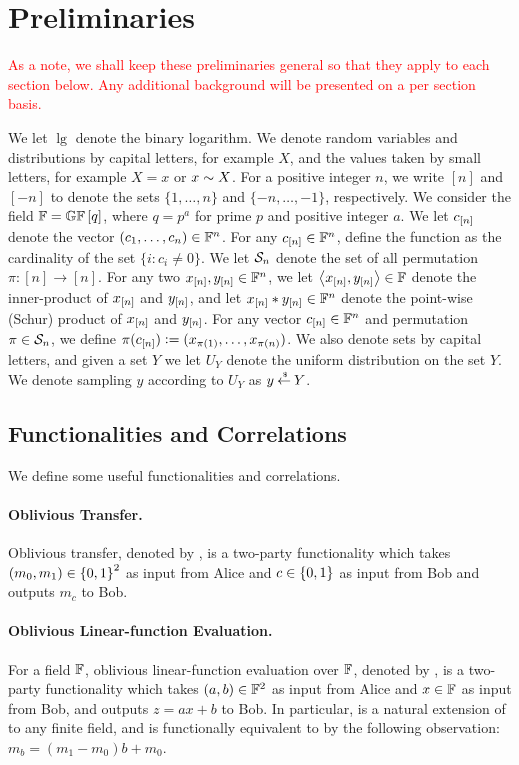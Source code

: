 \section{Preliminaries}\label{sec:prelims}
\textcolor{red}{As a note, we shall keep these preliminaries general so that they apply to each section below. Any additional background will be presented on a per section basis.}

We let $\lg$ denote the binary logarithm.
We denote random variables and distributions by capital letters, for example $X$, and the values taken by small letters, for example $X = x$ or $x \sim X$.
For a positive integer $n$, we write $[n]$ and $[-n]$ to denote the sets $\{ 1,\dotsc, n \}$ and $\{ -n,\dotsc, -1 \}$, respectively.
We consider the field ${\mathbb F} = {\mathbb G}{\mathbb F}\left[q\right]$, where $q = p^a$ for prime $p$ and positive integer $a$.
We let $c_{[n]}$ denote the vector $(c_1,\dotsc, c_n) \in {\mathbb F}^n$.
For any $c_{[n]} \in {\mathbb F}^n$, define the function  as the cardinality of the set $\{ i \colon c_i \neq 0 \}$.
We let ${\mathcal S}_n$ denote the set of all permutation $\pi \colon [n] \rightarrow [n]$.
For any two $x_{[n]}, y_{[n]} \in {\mathbb F}^n$, we let $\left\langle{x\ensuremath{_{[n]}}},{y_{[n]}}\right\rangle \in {\mathbb F}$ denote the inner-product of $x_{[n]}$ and $y_{[n]}$, and let $x_{[n]}*y_{[n]} \in {\mathbb F}^n$ denote the point-wise (Schur) product of $x_{[n]}$ and $y_{[n]}$.
For any vector $c_{[n]} \in {\mathbb F}^n$ and permutation $\pi \in {\mathcal S}_n$, we define $\pi(c_{[n]}){\;\vcentcolon=\;} (x_{\pi(1)},\dotsc, x_{\pi(n)})$.
We also denote sets by capital letters, and given a set $Y$ we let $U_Y$ denote the uniform distribution on the set $Y$.
We denote sampling $y$ according to $U_Y$ as $y \mathbin{\stackrel{\mbox{\,\tiny \$}}{\gets}} Y$.


\subsection{Functionalities and Correlations}\label{sec:prelim-func-corr}
We define some useful functionalities and correlations.

\paragraph{Oblivious Transfer.}
Oblivious transfer, denoted by \OT, is a two-party functionality which takes $(m_0,m_1) \in {\{0,1\}}^2$ as input from Alice and $c \in {\{0,1\}}$ as input from Bob and outputs $m_c$ to Bob.

\paragraph{Oblivious Linear-function Evaluation.}
For a field ${\mathbb F}$, oblivious linear-function evaluation over ${\mathbb F}$, denoted by \OLE[\bbF], is a two-party functionality which takes $(a,b) \in {\mathbb F}^2$ as input from Alice and $x \in {\mathbb F}$ as input from Bob, and outputs $z = ax+b$ to Bob.
In particular, \OLE[\bbF] is a natural extension of \OT to any finite field, and \OLE[\GF{2}] is functionally equivalent to \OT by the following observation: $m_b = (m_1 - m_0)b + m_0$.


